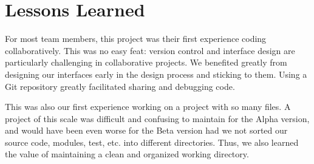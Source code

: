 \documentclass[11pt]{article}
\begin{document}



\section{Lessons Learned}
For most team members, this project was their first experience coding
collaboratively. This was no easy feat: version control and interface
design are particularly challenging in collaborative projects. We
benefited greatly from designing our interfaces early in the design
process and sticking to them. Using a Git repository greatly
facilitated sharing and debugging code.

This was also our first experience working on a project with so many
files. A project of this scale was difficult and confusing to maintain
for the Alpha version, and would have been even worse for the Beta
version had we not sorted our source code, modules, test, etc. into
different directories. Thus, we also learned the value of maintaining
a clean and organized working directory.
\end{document}
